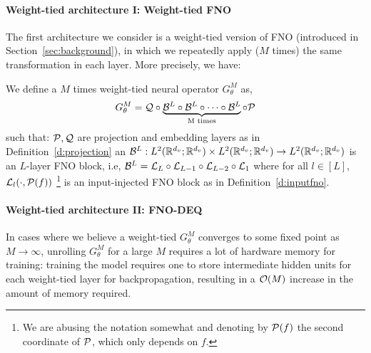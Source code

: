 \paragraph{Weight-tied architecture I: Weight-tied FNO}
The first architecture we consider is a weight-tied version of FNO (introduced in Section~\ref{sec:background}), in which we repeatedly apply ($M$ times) the same transformation in each layer. More precisely, we have:  














\begin{definition}
    \label{def:fno_weight_tied}
    We define a $M$ times weight-tied neural operator 
    $G^M_\theta$ as,
    \begin{align*}
        G^M_\theta = {\mathcal{Q}} \circ 
        \underbrace{{\mathcal{B}}^L \circ {\mathcal{B}}^L \circ \cdots \circ {\mathcal{B}}^L}_{\text{M times}} \circ {\mathcal{P}}
    \end{align*}
    such that: ${\mathcal{P}}, {\mathcal{Q}}$ are projection and embedding layers as in Definition~\ref{d:projection} 
        an ${\mathcal{B}}^L: L^2(\mathbb{R}^{d_v};\mathbb{R}^{d_v}) \times L^2(\mathbb{R}^{d_v};\mathbb{R}^{d_v}) \to L^2(\mathbb{R}^{d_v};\mathbb{R}^{d_v})$
    is an $L$-layer FNO block, i.e, $
        {\mathcal{B}}^L = {\mathcal{L}}_{L} \circ {\mathcal{L}}_{L-1} \circ {\mathcal{L}}_{L-2} \circ {\mathcal{L}}_{1}$ 
        where for all $l \in [L]$, ${\mathcal{L}}_l(\cdot, {\mathcal{P}}(f))$
        \footnote{We are abusing the notation somewhat and denoting by ${\mathcal{P}}(f)$ the second coordinate of ${\mathcal{P}}$, which only depends on $f$.} is an input-injected FNO block as in Definition~\ref{d:inputfno}. 
    
\end{definition}



\paragraph{Weight-tied architecture II: FNO-DEQ} %
In cases where we believe a weight-tied $G_\theta^M$ converges to some fixed point as $M \to \infty$, 
unrolling $G_\theta^M$ 
for a large $M$ requires a lot of hardware memory for training:  training the model requires one to store intermediate hidden units 
for each weight-tied layer for backpropagation, resulting in a ${\mathcal{O}}(M)$
increase in the amount of memory required. 

